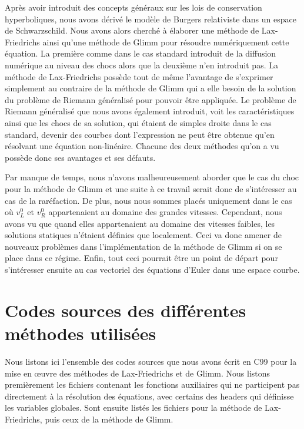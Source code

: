 \documentclass[11pt,a4paper]{article}
\begin{document}
Après avoir introduit des concepts généraux sur les lois de conservation hyperboliques, nous avons dérivé le modèle de Burgers relativiste dans un espace de Schwarzschild. Nous avons alors cherché à élaborer une méthode de Lax-Friedrichs ainsi qu'une méthode de Glimm pour résoudre numériquement cette équation. La première comme dans le cas standard introduit de la diffusion numérique au niveau des chocs alors que la deuxième n'en introduit pas. La méthode de Lax-Friedrichs possède tout de même l'avantage de s'exprimer simplement au contraire de la méthode de Glimm qui a elle besoin de la solution du problème de Riemann généralisé pour pouvoir être appliquée. Le problème de Riemann généralisé que nous avons également introduit, voit les caractéristiques ainsi que les chocs de sa solution, qui étaient de simples droite dans le cas standard, devenir des courbes dont l'expression ne peut être obtenue qu'en résolvant une équation non-linéaire.
Chacune des deux méthodes qu'on a vu possède donc ses avantages et ses défauts.

Par manque de temps, nous n'avons malheureusement aborder que le cas du choc pour la méthode de Glimm et une suite à ce travail serait donc de s'intéresser au cas de la raréfaction. De plus, nous nous sommes placés uniquement dans le cas où $v_L^0$ et $v_R^0$ appartenaient au domaine des grandes vitesses. Cependant, nous avons vu que quand elles appartenaient au domaine des vitesses faibles, les solutions statiques n'étaient définies que localement. Ceci va donc amener de nouveaux problèmes dans l’implémentation de la méthode de Glimm si on se place dans ce régime. Enfin, tout ceci pourrait être un point de départ pour s'intéresser ensuite au cas vectoriel des équations d'Euler dans une espace courbe.

\newpage
\appendix

\section{Codes sources des différentes méthodes utilisées}\label{annexe}

Nous listons ici l'ensemble des codes sources que nous avons écrit en C99 pour la mise en \oe uvre des méthodes de Lax-Friedrichs et de Glimm. Nous listons premièrement les fichiers contenant les fonctions auxiliaires qui ne participent pas directement à la résolution des équations, avec certains des headers qui définisse les variables globales. Sont ensuite listés les fichiers pour la méthode de Lax-Friedrichs, puis ceux de la méthode de Glimm.
\end{document}
